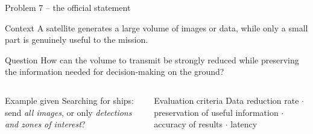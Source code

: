 \documentclass[aspectratio=169,10pt]{beamer}
\begin{document}
\begin{frame}{Problem 7 -- the official statement}
\begin{block}{Context}
A satellite generates a large volume of images or data, while only a small part is genuinely useful to the mission.
\end{block}
\begin{block}{Question}
How can the volume to transmit be strongly reduced while preserving the information needed for decision-making on the ground?
\end{block}
\begin{columns}[T]
\begin{exampleblock}{Example given}
Searching for ships: send \emph{all images}, or only \emph{detections and zones of interest}?
\end{exampleblock}
\begin{alertblock}{Evaluation criteria}
Data reduction rate $\cdot$ preservation of useful information $\cdot$ accuracy of results $\cdot$ latency
\end{alertblock}
\end{columns}
\end{frame}
\end{document}
